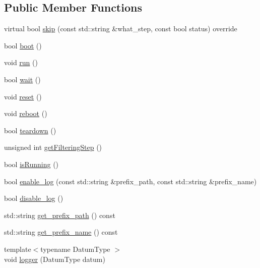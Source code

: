 \subsection*{Public Member Functions}
\begin{DoxyCompactItemize}
\item 
virtual bool \mbox{\hyperlink{classbfl_1_1ParticleFilter_a2d7a5e7aaad179037273d35be229056d}{skip}} (const std\+::string \&what\+\_\+step, const bool status) override
\item 
bool \mbox{\hyperlink{classbfl_1_1FilteringAlgorithm_a96651f8464190c0a56d79219a1017147}{boot}} ()
\item 
void \mbox{\hyperlink{classbfl_1_1FilteringAlgorithm_a009cbe5f4bbb16967f6c6ddcaed8fbb1}{run}} ()
\item 
bool \mbox{\hyperlink{classbfl_1_1FilteringAlgorithm_a40372c24fa050eb0274371172df0a244}{wait}} ()
\item 
void \mbox{\hyperlink{classbfl_1_1FilteringAlgorithm_a2403c62fbd7bd7f5cda56a84f5f30331}{reset}} ()
\item 
void \mbox{\hyperlink{classbfl_1_1FilteringAlgorithm_a6022859aa985474fb997343cc935b11e}{reboot}} ()
\item 
bool \mbox{\hyperlink{classbfl_1_1FilteringAlgorithm_a1dc912d89ee8f96d4f3e8209865c5308}{teardown}} ()
\item 
unsigned int \mbox{\hyperlink{classbfl_1_1FilteringAlgorithm_a8c43b1f3dac30934c0a03de348d4a29d}{get\+Filtering\+Step}} ()
\item 
bool \mbox{\hyperlink{classbfl_1_1FilteringAlgorithm_a5cfecab2c778620e2557237472bb1721}{is\+Running}} ()
\item 
bool \mbox{\hyperlink{classbfl_1_1Logger_ae94b97b6e8d7902e8ce048384813122e}{enable\+\_\+log}} (const std\+::string \&prefix\+\_\+path, const std\+::string \&prefix\+\_\+name)
\item 
bool \mbox{\hyperlink{classbfl_1_1Logger_a440467a28ccc46490d767fe0ef6f556a}{disable\+\_\+log}} ()
\item 
std\+::string \mbox{\hyperlink{classbfl_1_1Logger_a56cf1a4e712bf23d9978420a8a59a62b}{get\+\_\+prefix\+\_\+path}} () const
\item 
std\+::string \mbox{\hyperlink{classbfl_1_1Logger_a913a795b7bfbf378815eeb342d68a7c0}{get\+\_\+prefix\+\_\+name}} () const
\item 
{\footnotesize template$<$typename Datum\+Type $>$ }\\void \mbox{\hyperlink{classbfl_1_1Logger_a1033ff31398484f2132f84fd140da9e3}{logger}} (Datum\+Type datum)

\end{DoxyCompactItemize}
